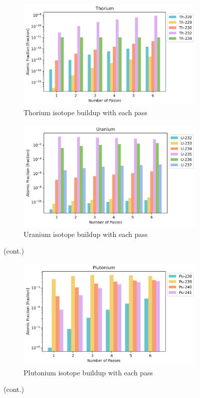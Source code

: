 \begin{figure}[H]\ContinuedFloat
\centering


\begin{subfigure}{0.95\textwidth}
  \includegraphics[width=\linewidth]{figures/compositions/thorium}
  \caption{Thorium isotope buildup with each pass}
  \label{fig:th}
\end{subfigure}%

\begin{subfigure}{0.95\textwidth}
  \includegraphics[width=\linewidth]{figures/compositions/uranium}
  \caption{Uranium isotope buildup with each pass}
  \label{fig:u}
\end{subfigure}%

\caption[]{(cont.)}
\end{figure}

\begin{figure}[H]\ContinuedFloat
\centering

\begin{subfigure}{0.95\textwidth}
  \includegraphics[width=\linewidth]{figures/compositions/plutonium}
  \caption{Plutonium isotope buildup with each pass}
  \label{fig:pu}
\end{subfigure}%

\caption[]{(cont.)}
\label{fig:comps}
\end{figure}